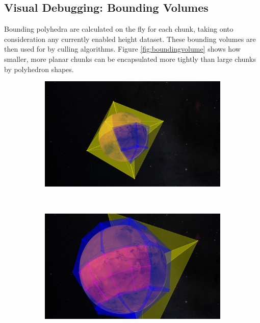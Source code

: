 \clearpage
\subsection{Visual Debugging: Bounding Volumes}
\FloatBarrier
Bounding polyhedra are calculated on the fly for each chunk, taking onto consideration any currently enabled height dataset. These bounding volumes are then used for by culling algorithms. Figure \ref{fig:boundingvolume} shows how smaller, more planar chunks can be encapsulated more tightly than large chunks by polyhedron shapes.
\begin{figure}[h]
    \centering
    \begin{subfigure}[bt]{0.45\textwidth}
        \includegraphics[width=\textwidth]{figures/results/screenshots_thesis_old/bounds1.jpg}
        \caption{}
    \end{subfigure}
    ~
    \begin{subfigure}[bt]{0.45\textwidth}
        \includegraphics[width=\textwidth]{figures/results/screenshots_thesis_old/bounds2.jpg}
        \caption{}

\end{subfigure}
\end{figure}
